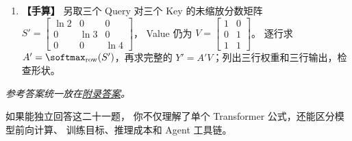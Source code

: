 \begin{enumerate}[label=\textbf{C2-\arabic*.},leftmargin=2.8em]
\texttt{scripts/review\_exercises\_demo.py} 中的
\texttt{sliding\_mask(n,window)} 函数。
保留原有 $n=5,w=2$ 的九个允许位置对测试，
再为 $n=5,w=3$ 添加一条计算所有矩阵元素之和的断言。
期望的允许位置对总数是多少？与 $w=2$ 相比增加多少？
\item {}\label{exercise:C2-21}  \label{exercise:batch-attention-new} \textbf{【手算】}
另取三个 Query 对三个 Key 的未缩放分数矩阵
$S'=\begin{bmatrix}\ln2&0&0\\0&\ln3&0\\0&0&\ln4\end{bmatrix}$，
Value 仍为
$V=\begin{bmatrix}1&0\\0&1\\1&1\end{bmatrix}$。
逐行求 $A'=\softmax_{\rm row}(S')$，再求完整的
$Y'=A'V$；列出三行权重和三行输出，检查形状。
\end{enumerate}

\noindent\emph{参考答案统一放在\hyperref[app:answers]{附录答案}。}

\begin{conclusion}
如果能独立回答这二十一题，
你不仅理解了单个 Transformer 公式，还能区分模型前向计算、
训练目标、推理成本和 Agent 工具链。
\end{conclusion}

